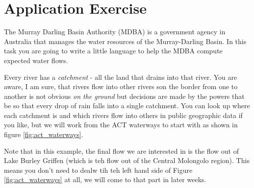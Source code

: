 \documentclass[twoside=false, DIV=14]{scrartcl}
\begin{document}
\newpage
\part*{Application Exercise}

The Murray Darling Basin Authority (MDBA) is a government agency in Australia that manages the water resources of the Murray-Darling Basin. In this task you are going to write a little language to help the MDBA compute expected water flows.

Every river has a \emph{catchment} - all the land that drains into that river.  You are aware, I am sure, that rivers flow into other rivers son the border from one to another is not obvious \emph{on the ground} but decisions are made by the powers that be so that every drop of rain falls into a single catchment.  You can look up where each catchment is and which rivers flow into others in public geographic data if you like, but we will work from the ACT waterways to start with as shown in figure \ref{fig:act_waterways}.

Note that in this example, the final flow we are interested in is the flow out of Lake Burley Griffen (which is teh flow out of the Central Molongolo region).  This means you don't need to dealw tih teh left hand side of Figure \ref{fig:act_waterways} at all, we will come to that part in later weeks.
\end{document}
